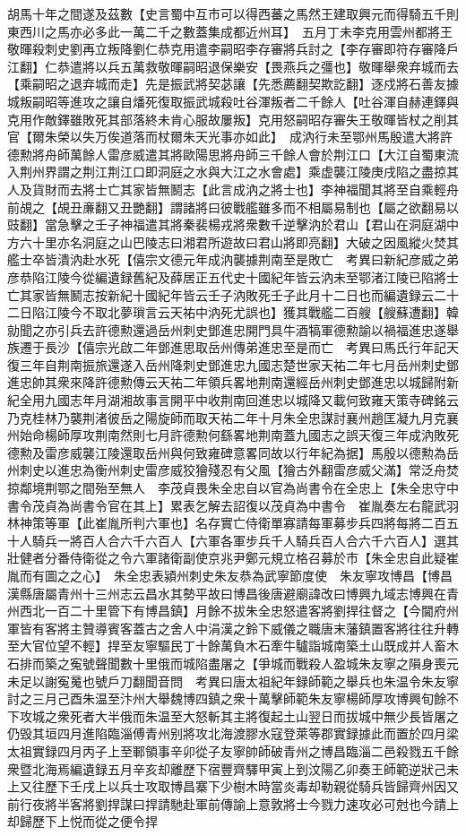 胡馬十年之間遂及茲數【史言蜀中互市可以得西蕃之馬然王建取興元而得騎五千則東西川之馬亦必多此一萬二千之數蓋集成都近州耳】　五月丁未李克用雲州都將王敬暉殺刺史劉再立叛降劉仁恭克用遣李嗣昭李存審將兵討之【李存審即符存審降戶江翻】仁恭遣將以兵五萬救敬暉嗣昭退保樂安【畏燕兵之彊也】敬暉舉衆弃城而去【乘嗣昭之退弃城而走】先是振武將契苾讓【先悉薦翻契欺訖翻】逐戍將石善友據城叛嗣昭等進攻之讓自燔死復取振武城殺吐谷渾叛者二千餘人【吐谷渾自赫連鐸與克用作敵鐸雖敗死其部落終未肯心服故屢叛】克用怒嗣昭存審失王敬暉皆杖之削其官【爾朱榮以失万俟道落而杖爾朱天光事亦如此】　成汭行未至鄂州馬殷遣大將許德勲將舟師萬餘人雷彦威遣其將歐陽思將舟師三千餘人會於荆江口【大江自蜀東流入荆州界謂之荆江荆江口即洞庭之水與大江之水會處】乘虚襲江陵庚戌陷之盡掠其人及貨財而去將士亡其家皆無鬭志【此言成汭之將士也】李神福聞其將至自乘輕舟前覘之【覘丑亷翻又丑艷翻】謂諸將曰彼戰艦雖多而不相屬易制也【屬之欲翻易以豉翻】當急擊之壬子神福遣其將秦裴楊戎將衆數千逆擊汭於君山【君山在洞庭湖中方六十里亦名洞庭之山巴陵志曰湘君所遊故曰君山將即亮翻】大破之因風縱火焚其艦士卒皆潰汭赴水死【僖宗文德元年成汭襲據荆南至是敗亡　考異曰新紀彦威之弟彦恭陷江陵今從編遺録舊紀及薛居正五代史十國紀年皆云汭未至鄂渚江陵已陷將士亡其家皆無鬭志按新紀十國紀年皆云壬子汭敗死壬子此月十二日也而編遺録云二十二日陷江陵今不取北夢瑣言云天祐中汭死尤誤也】獲其戰艦二百艘【艘蘇遭翻】韓勍聞之亦引兵去許德勲還過岳州刺史鄧進忠開門具牛酒犒軍德勲諭以禍福進忠遂舉族遷于長沙【僖宗光啟二年鄧進思取岳州傳弟進忠至是而亡　考異曰馬氏行年記天復三年自荆南振旅還遂入岳州降刺史鄧進忠九國志楚世家天祐二年七月岳州刺史鄧進忠帥其衆來降許德勲傳云天祐二年領兵畧地荆南還經岳州刺史鄧進忠以城歸附新紀全用九國志年月湖湘故事言開平中收荆南回進忠以城降又載何致雍天策寺碑銘云乃克桂林乃襲荆渚彼岳之陽旋師而取天祐二年十月朱全忠謀討襄州趙匡凝九月克襄州始命楊師厚攻荆南然則七月許德勲何繇畧地荆南蓋九國志之誤天復三年成汭敗死德勲及雷彦威襲江陵還取岳州與何致雍碑意畧同故以行年紀為据】馬殷以德勲為岳州刺史以進忠為衡州刺史雷彦威狡獪殘忍有父風【獪古外翻雷彦威父滿】常泛舟焚掠鄰境荆鄂之間殆至無人　李茂貞畏朱全忠自以官為尚書令在全忠上【朱全忠守中書令茂貞為尚書令官在其上】累表乞解去詔復以茂貞為中書令　崔胤奏左右龍武羽林神策等軍【此崔胤所判六軍也】名存實亡侍衛單寡請每軍募步兵四將每將二百五十人騎兵一將百人合六千六百人【六軍各軍步兵千人騎兵百人合六千六百人】選其壯健者分番侍衛從之令六軍諸衛副使京兆尹鄭元規立格召募於市【朱全忠自此疑崔胤而有圖之之心】　朱全忠表潁州刺史朱友恭為武寧節度使　朱友寧攻博昌【博昌漢縣唐屬青州十三州志云昌水其勢平故曰博昌後唐避廟諱改曰博興九域志博興在青州西北一百二十里管下有博昌鎮】月餘不拔朱全忠怒遣客將劉捍往督之【今閫府州軍皆有客將主贊導賓客蓋古之舍人中涓漢之鈴下威儀之職唐末藩鎮置客將往往升轉至大官位望不輕】捍至友寧驅民丁十餘萬負木石牽牛驢詣城南築土山既成并人畜木石排而築之寃號聲聞數十里俄而城陷盡屠之【爭城而戰殺人盈城朱友寧之隕身喪元未足以謝寃䰟也號戶刀翻聞音問　考異曰唐太祖紀年録師範之舉兵也朱温令朱友寧討之三月己酉朱温至汴州大舉魏博四鎮之衆十萬擊師範朱友寧楊師厚攻博興旬餘不下攻城之衆死者大半俄而朱温至大怒斬其主將復起土山翌日而拔城中無少長皆屠之仍毁其垣四月進陷臨淄傅青州别將攻北海渡膠水寇登萊等郡實録據此而置於四月梁太祖實録四月丙子上至鄆領事辛卯從子友寧帥師破青州之博昌臨淄二邑殺戮五千餘衆暨北海焉編遺録五月辛亥却離歷下宿豐齊驛甲寅上到汶陽乙卯奏王師範逆狀己未上又往歷下壬戌上以兵士攻取博昌寨下少樹木時當炎毒却勒親從騎兵皆歸齊州因又前行夜將半客將劉捍謀曰捍請馳赴軍前傳諭上意敦將士今戮力速攻必可尅也今請上却歸歷下上悦而從之便令捍